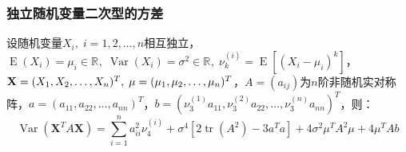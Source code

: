 \subsubsection{独立随机变量二次型的方差}
\begin{theorem}\label{theo:VRVQuadraticForm}
	设随机变量$X_i,\;i=1,2,\dots,n$相互独立，$\operatorname{E}(X_i)=\mu_i\in\mathbb{R}^{},\;\operatorname{Var}(X_i)=\sigma^2\in\mathbb{R}^{},\;\nu_k^{(i)}=\operatorname{E}[(X_i-\mu_i)^k]$，$\mathbf{X}=(X_1, X_2, \dots, X_{n})^T,\;\mu=(\mu_1, \mu_2, \dots, \mu_{n})^T$，$A=(a_{ij})$为$n$阶非随机实对称阵，$a=(a_{11},a_{22},\dots,a_{nn})^T$，$b=(\nu_3^{(1)}a_{11},\nu_3^{(2)}a_{22},\dots,\nu_3^{(n)}a_{nn})^T$，则：
	\begin{equation*}
		\operatorname{Var}(\mathbf{X}^TA\mathbf{X})=\sum_{i=1}^{n}a_{ii}^2\nu_4^{(i)}+\sigma^4[2\operatorname{tr}(A^2)-3a^Ta]+4\sigma^2\mu^TA^2\mu+4\mu^TAb
	\end{equation*}
\end{theorem}
